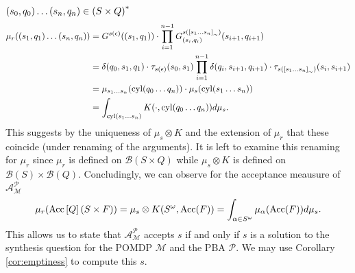 $\left(s_{0}, q_{0}\right)\dots\left(s_{n}, q_{n}\right)\in\left(S\times Q\right)^{*}$
\begin{align*}
  \mu_{r}(\left(s_{1}, q_{1}\right)\dots\left(s_{n}, q_{n}\right)) &= 
    G^{s(\epsilon)}(\left(s_{1}, q_{1}\right))\cdot 
    \prod\limits_{i = 1}^{n-1}
      G^{s(\left[s_{1}\dots s_{n}\right]_{\sim})}_{\left(s_{i}, q_{i}\right)}(
        s_{i+1}, q_{i+1})\\
  &= \delta(q_{0}, s_{1}, q_{1})\cdot\tau_{s(\epsilon)}(s_{0}, s_{1})
    \prod\limits_{i = 1}^{n-1}
      \delta(q_{i}, s_{i+1}, q_{i+1})\cdot
      \tau_{s(\left[s_{1}\dots s_{n}\right]_{\sim})}(s_{i}, s_{i+1})\\
  &= \mu_{s_{1}\dots s_{n}}(\operatorname{cyl}(q_{0}\dots q_{n}))\cdot
    \mu_{s}(\operatorname{cyl}(s_{1}\dots s_{n}))\\
  &= \int_{\operatorname{cyl}(s_{1}\dots s_{n})}K(\cdot, \operatorname{cyl}(q_{0}\dots q_{n}))d\mu_{s}.
\end{align*}
This suggests by the uniqueness of $\mu_{s}\otimes K$ and the extension of
$\mu_{r}$ that these coincide (under renaming of the arguments). It is left
to examine this renaming for $\mu_{r}$ since $\mu_{r}$ is defined on 
$\mathcal{B}(S\times Q)$ while $\mu_{s}\otimes K$ is defined on 
$\mathcal{B}(S)\times\mathcal{B}(Q)$.
Concludingly, we can observe for the acceptance meausure of 
$\mathcal{A}_{\mathcal{M}}^{\mathcal{P}}$ 
\begin{equation*}
  \mu_{r}(\operatorname{Acc}\left[Q\right](S\times F))  
  = \mu_{s}\otimes K(S^{\omega}, \operatorname{Acc}(F))
  = \int_{\alpha\in S^{\omega}}\mu_{\alpha}(\operatorname{Acc}(F)) d\mu_{s}.
\end{equation*}
This allows us to state that $\mathcal{A}_{\mathcal{M}}^{\mathcal{P}}$ 
accepts $s$ if and only if $s$ is a solution to the synthesis question for 
the \ac{POMDP} $\mathcal{M}$ and the \ac{PBA} $\mathcal{P}$. We may use
Corollary \ref{cor:emptiness} to compute this $s$.

